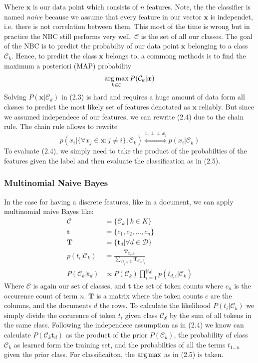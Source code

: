 Where $\boldsymbol{x}$ is our data point which consists of $n$ features. Note, the the classifier is named \textsl{naive} because we assume that every feature in our vector $\boldsymbol{x}$ is independet, i.e. there is not correlation between them. This most of the time is wrong but in practice the NBC still performs very well. $\mathcal{C}$ is the set of all our classes. The goal of the NBC is to predict the probabilty of our data point $\boldsymbol{x}$ belonging to a class $\mathcal{C}_k$. Hence, to predict the class $\boldsymbol{x}$ belongs to, a commong methods is to find the maximum a posteriori (MAP) probability
\begin{gather}
  \operatorname*{arg\,max}_{k \in \mathcal{C}} P(\mathcal{C}_k|\boldsymbol{x})
\end{gather}
 Solving $P(\boldsymbol{x} |\mathcal{C}_k)$ in (2.3) is hard and requires a huge amount of data form all classes to predict the most likely set of features denotated as $\boldsymbol{x}$ reliably. But since we assumed independece of our features, we can rewrite (2.4) due to the chain rule. The chain rule allows to rewrite
 \[p(x_i| \{\forall x_j \in \boldsymbol{x} : j \neq i \}, \mathcal{C}_k) \overset{x_i\perp\!\!\!\perp x_j}{\Longleftrightarrow} p(x_i|\mathcal{C}_k)\]
 To evaluate (2.4), we simply need to take the product of the probabilties of the features given the label and then evaluate the classification as in (2.5).

\subsubsection{Multinomial Naive Bayes}
In the case for having a discrete features, like in a document, we can apply multinomial naive Bayes like:
\begin{align}
  \mathcal{C} &= \{\mathcal{C}_k \: | \: k \in K \} \\
  \boldsymbol{t} &= \{c_1, c_2, \dots, c_n\} \\
  \boldsymbol{T} &= \{\boldsymbol{t}_d | \forall d \in \mathcal{D}\} \\
  p({t_{i}}|\mathcal{C}_k) &= \frac{\boldsymbol{T}_{\mathcal{C}_k,t_{i}}}{\sum_{\forall t_j \in \boldsymbol{T}}\boldsymbol{T}_{\mathcal{C}_k,t_j}} \\
  P(\mathcal{C}_k|\boldsymbol{t}_d) &\propto P(\mathcal{C}_k) \prod_{i=1}^{|t_{d}|}  p(t_{d,i}|\mathcal{C}_k)
\end{align}
Where $\mathcal{C}$ is again our set of classes, and $\boldsymbol{t}$ the set of token counts where $c_n$ is the occurence count of term $n$. $\boldsymbol{T}$ is a matrix where the token counts $c$ are the columns, and the documents $d$ the rows. To calculate the likelihood $P({t_{i}}|\mathcal{C}_k)$ we simply divide the occurence of token $t_i$ given class $\mathcal{C_k}$ by the sum of all tokens in the same class. Following the independece assumption as in (2.4) we know can calculate $P(\mathcal{C}_k\boldsymbol{t}_d)$ as the product of the prior $P(\mathcal{C}_k)$, the probability of class $\mathcal{C}_k$
as learned form the training set, and the probabilties of all the terms $t_{1 \dots n}$ given the prior class. For classificaiton, the $\operatorname*{arg\,max}$ as in (2.5) is taken.

